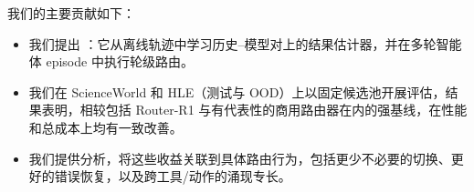 我们的主要贡献如下：
\begin{itemize}[nolistsep, noitemsep, leftmargin=*]
\item 我们提出 \textbf{\method}：它从离线轨迹中学习历史--模型对上的结果估计器，并在多轮智能体 episode 中执行轮级路由。
\item 我们在 ScienceWorld 和 HLE（测试与 OOD）上以固定候选池开展评估，结果表明，相较包括 Router-R1 与有代表性的商用路由器在内的强基线，\method 在性能和总成本上均有一致改善。
\item 我们提供分析，将这些收益关联到具体路由行为，包括更少不必要的切换、更好的错误恢复，以及跨工具/动作的涌现专长。
\end{itemize}
